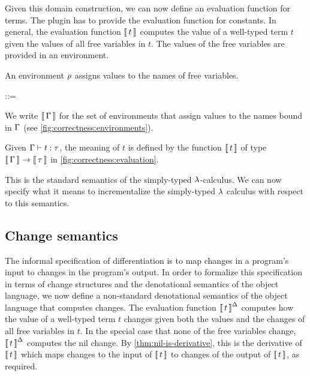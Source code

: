 Given this domain
construction, we can now define an evaluation function for
terms. The plugin has to provide the evaluation function for
constants. In general, the evaluation function $\Eval{t}$ computes the value of a
well-typed term $t$ given the values of all free variables in
$t$. The values of the free variables are provided in an
environment.

\begin{definition}[Environments]
  An environment $\rho$ assigns values to the names of free
  variables.

  \begin{syntax}
    \Gr ::= \EmptyContext \mid {}
  \end{syntax}

  We write $\Eval{\GG}$ for the set of environments that assign
  values to the names bound in $\Gamma$ (see
  \cref{fig:correctness:environments}).
\end{definition}

\begin{definition}[Evaluation]
  \label{def:evaluation}
  Given $\Typing{t}{\tau}$, the meaning of $t$ is defined by the
  function $\Eval{t}$ of type $\Fun{\Eval{\GG}}{\Eval{\tau}}$
  in \cref{fig:correctness:evaluation}.
\end{definition}

This is the standard semantics of the simply-typed
$\lambda$-calculus.
We can now specify what it means to incrementalize the
simply-typed $\lambda$ calculus with respect to this semantics.

\subsection{Change semantics}
The informal specification of differentiation is to map
changes in a program's input to changes in the program's
output. In order to formalize this specification in terms of
change structures and the denotational semantics of the object
language,
we now define a non-standard denotational semantics of the object
language that computes changes. The evaluation function
$\EvalInc{t}$ computes how the value of a well-typed term $t$
changes given both the values and the changes of all free
variables in $t$.
In the special case that none of the free variables change,
$\EvalInc{t}$ computes the nil change. By
\cref{thm:nil-is-derivative}, this is the derivative of
$\Eval{t}$ which maps changes to the input of $\Eval{t}$ to
changes of the output of $\Eval{t}$, as required.

